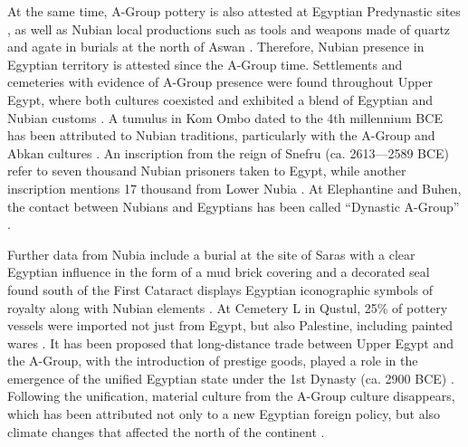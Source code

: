 At the same time, A-Group pottery is also attested at Egyptian Predynastic sites \parencite[p.~63-64]{gattoNubianAGroupReassessment2006}, as well as Nubian local productions such as tools and weapons made of quartz and agate in burials at the north of Aswan \parencite[p.~95]{gattoCulturalEntanglementDawn2014}. Therefore, Nubian presence in Egyptian territory is attested since the A-Group time. Settlements and cemeteries with evidence of A-Group presence were found throughout Upper Egypt, where both cultures coexisted and exhibited a blend of Egyptian and Nubian customs \parencites[p.~129]{gattoEgyptNubia5th4th2009}[p.~290-291]{meurerNubiansEgyptEarly2020}. A tumulus in Kom Ombo dated to the 4th millennium BCE has been attributed to Nubian traditions, particularly with the A-Group and Abkan cultures \parencites{gattoNubiansEgyptSurvey2005, gattoEgyptNubia5th4th2009}. An inscription from the reign of Snefru (ca. 2613—2589 BCE) refer to seven thousand Nubian prisoners taken to Egypt, while another inscription mentions 17 thousand from Lower Nubia \parencite[p.~291]{meurerNubiansEgyptEarly2020}. At Elephantine and Buhen, the contact between Nubians and Egyptians has been called “Dynastic A-Group” \parencite[p.~4]{raueWhoWasWho2008}.

Further data from Nubia include a burial at the site of Saras with a clear Egyptian influence in the form of a mud brick covering and a decorated seal found south of the First Cataract displays Egyptian iconographic symbols of royalty along with Nubian elements \parencite[p.~134, 136]{gattoAGroup4thMillennium2020}. At Cemetery L in Qustul, 25\% of pottery vessels were imported not just from Egypt, but also Palestine, including painted wares \parencite[p.~294]{Raue2019a}. It has been proposed that long-distance trade between Upper Egypt and the A-Group, with the introduction of prestige goods, played a role in the emergence of the unified Egyptian state under the 1st Dynasty (ca. 2900 BCE) \parencite[p.~49]{torokTwoWorldsFrontier2009}. Following the unification, material culture from the A-Group culture disappears, which has been attributed not only to a new Egyptian foreign policy, but also climate changes that affected the north of the continent \parencites[p.~73]{edwardsNubianArchaeologySudan2004}{gattoAGroup4thMillennium2020}.

